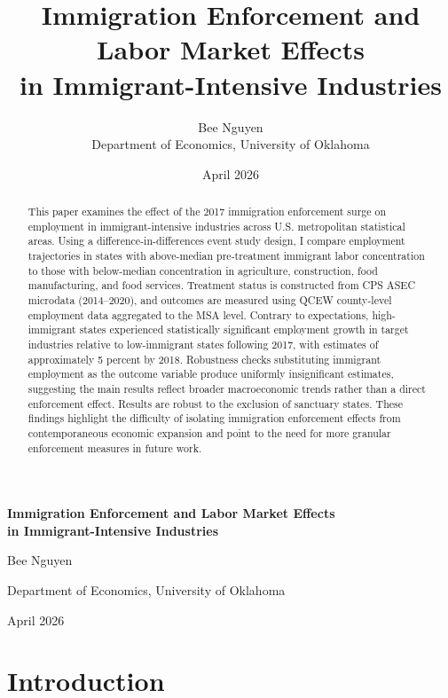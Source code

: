 \documentclass[12pt]{article}
\title{Immigration Enforcement and Labor Market Effects\\
       in Immigrant-Intensive Industries}
\author{Bee Nguyen\\
        \small Department of Economics, University of Oklahoma}
\date{April 2026}
\begin{document}
 
\begin{titlepage}
    \centering
    \vspace*{3cm}
    {\LARGE\bfseries Immigration Enforcement and Labor Market Effects\\[0.3cm]
    in Immigrant-Intensive Industries\par}
    \vspace{1.5cm}
    {\large Bee Nguyen\par}
    {\normalsize Department of Economics, University of Oklahoma\par}
    \vspace{1cm}
    {\large April 2026\par}
    \vspace{2cm}

\end{titlepage}
\begin{abstract}
This paper examines the effect of the 2017 immigration enforcement surge on 
employment in immigrant-intensive industries across U.S. metropolitan statistical 
areas. Using a difference-in-differences event study design, I compare employment 
trajectories in states with above-median pre-treatment immigrant labor concentration 
to those with below-median concentration in agriculture, construction, food 
manufacturing, and food services. Treatment status is constructed from CPS ASEC 
microdata (2014--2020), and outcomes are measured using QCEW county-level 
employment data aggregated to the MSA level. Contrary to expectations, high-immigrant 
states experienced statistically significant employment growth in target industries 
relative to low-immigrant states following 2017, with estimates of approximately 
5 percent by 2018. Robustness checks substituting immigrant employment as the 
outcome variable produce uniformly insignificant estimates, suggesting the main 
results reflect broader macroeconomic trends rather than a direct enforcement 
effect. Results are robust to the exclusion of sanctuary states. These findings 
highlight the difficulty of isolating immigration enforcement effects from 
contemporaneous economic expansion and point to the need for more granular 
enforcement measures in future work.
\end{abstract}

\newpage
 

\section{Introduction}
\end{document}
